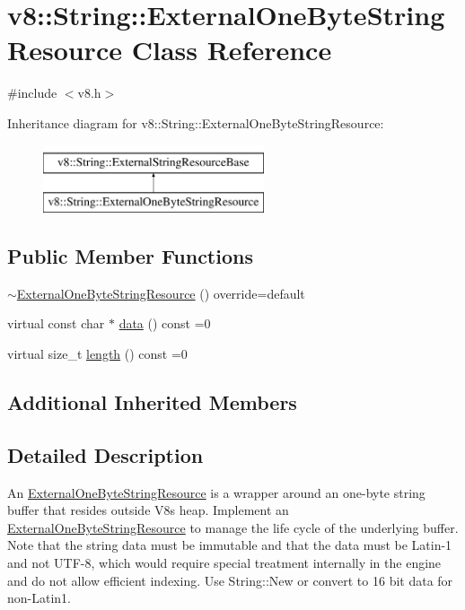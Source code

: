 \hypertarget{classv8_1_1String_1_1ExternalOneByteStringResource}{}\section{v8\+:\+:String\+:\+:External\+One\+Byte\+String\+Resource Class Reference}
\label{classv8_1_1String_1_1ExternalOneByteStringResource}


{\ttfamily \#include $<$v8.\+h$>$}

Inheritance diagram for v8\+:\+:String\+:\+:External\+One\+Byte\+String\+Resource\+:\begin{figure}[H]
\begin{center}
\leavevmode
\includegraphics[height=2.000000cm]{classv8_1_1String_1_1ExternalOneByteStringResource}
\end{center}
\end{figure}
\subsection*{Public Member Functions}
\begin{DoxyCompactItemize}
\item 
\mbox{\hyperlink{classv8_1_1String_1_1ExternalOneByteStringResource_ac75c47722e5602b863cbc880dc4f5b7c}{$\sim$\+External\+One\+Byte\+String\+Resource}} () override=default
\item 
virtual const char $\ast$ \mbox{\hyperlink{classv8_1_1String_1_1ExternalOneByteStringResource_aaeca31240d3dbf990d1b974e3c64593e}{data}} () const =0
\item 
virtual size\+\_\+t \mbox{\hyperlink{classv8_1_1String_1_1ExternalOneByteStringResource_ad6b702f05798bcfc3975cb922f32b5ab}{length}} () const =0
\end{DoxyCompactItemize}
\subsection*{Additional Inherited Members}


\subsection{Detailed Description}
An \mbox{\hyperlink{classv8_1_1String_1_1ExternalOneByteStringResource}{External\+One\+Byte\+String\+Resource}} is a wrapper around an one-\/byte string buffer that resides outside V8\textquotesingle{}s heap. Implement an \mbox{\hyperlink{classv8_1_1String_1_1ExternalOneByteStringResource}{External\+One\+Byte\+String\+Resource}} to manage the life cycle of the underlying buffer. Note that the string data must be immutable and that the data must be Latin-\/1 and not U\+T\+F-\/8, which would require special treatment internally in the engine and do not allow efficient indexing. Use String\+::\+New or convert to 16 bit data for non-\/\+Latin1. 

